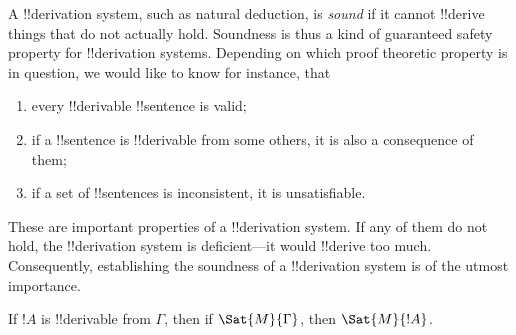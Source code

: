 \documentclass[../../include/open-logic-section]{subfiles}
\begin{document}

\begin{explain}
A !!{derivation} system, such as natural deduction, is \emph{sound}
if it cannot !!{derive} things that do not actually hold.  Soundness is
thus a kind of guaranteed safety property for !!{derivation} systems.
Depending on which proof theoretic property is in question, we would
like to know for instance, that
\begin{enumerate}
\item every !!{derivable} !!{sentence} is valid;
\item if a !!{sentence} is !!{derivable} from some others, it is also a
  consequence of them;
\item if a set of !!{sentence}s is inconsistent, it is unsatisfiable.
\end{enumerate}
These are important properties of a !!{derivation} system.  If any of them do
not hold, the !!{derivation} system is deficient---it would !!{derive} too much.
Consequently, establishing the soundness of a !!{derivation} system is of the
utmost importance.
\end{explain}

\begin{thm}[Soundness]
 If $!A$ is !!{derivable} from $\Gamma$,
 then if $\Sat{M}{\Gamma}$, then $\Sat{M}{!A}$.
\end{thm}
\end{document}
